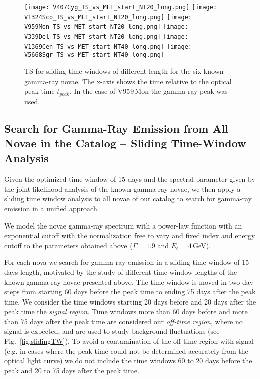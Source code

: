 \documentclass{aa} %
\begin{document}
\begin{figure*}[htb!]
\begin{center}
\texttt{[image: V407Cyg\_TS\_vs\_MET\_start\_NT20\_long.png]}
\texttt{[image: V1324Sco\_TS\_vs\_MET\_start\_NT20\_long.png]}
\texttt{[image: V959Mon\_TS\_vs\_MET\_start\_NT20\_long.png]}
\texttt{[image: V339Del\_TS\_vs\_MET\_start\_NT20\_long.png]}
\texttt{[image: V1369Cen\_TS\_vs\_MET\_start\_NT40\_long.png]}
\texttt{[image: V5668Sgr\_TS\_vs\_MET\_start\_NT40\_long.png]}
\noindent
\caption{\small TS for sliding time windows of different length for the six known gamma-ray novae. The x-axis shows the time relative to the optical peak time $t_{peak}$. In the case of V959\,Mon the gamma-ray peak was used.}
\label{fig:slidingTWKnownNovae}
\end{center}
\end{figure*}


\subsection{Search for Gamma-Ray Emission from All Novae in the Catalog -- Sliding Time-Window Analysis}

Given the optimized time window of 15 days and the spectral parameter given by the joint likelihood analysis of the known gamma-ray novae, we then apply a sliding time window analysis to all novae of our catalog to search for gamma-ray emission in a unified approach.

We model the novae gamma-ray spectrum with a power-law function with an exponential cutoff with the normalization free to vary and fixed index and energy cutoff to the parameters obtained above ($\Gamma = 1.9$ and $E_c = 4$\,GeV).  

For each nova we search for gamma-ray emission in a sliding time window of 15-days length, motivated by the study of different time window lengths of the known gamma-ray novae presented above. The time window is moved in two-day steps from starting 60 days before the peak time to ending 75 days after the peak time. We consider the time windows starting 20 days before and 20 days after the peak time the \textit{signal region}. Time windows more than 60 days before and more than 75 days after the peak time are considered our \textit{off-time region}, where no signal is expected, and are used to study background fluctuations (see Fig.~\ref{fig:slidingTW}). To avoid a contamination of the off-time region with signal (e.g. in cases where the peak time could not be determined accurately from the optical light curve) we do not include the time windows 60 to 20 days before the peak and 20 to 75 days after the peak time.
\end{document}
